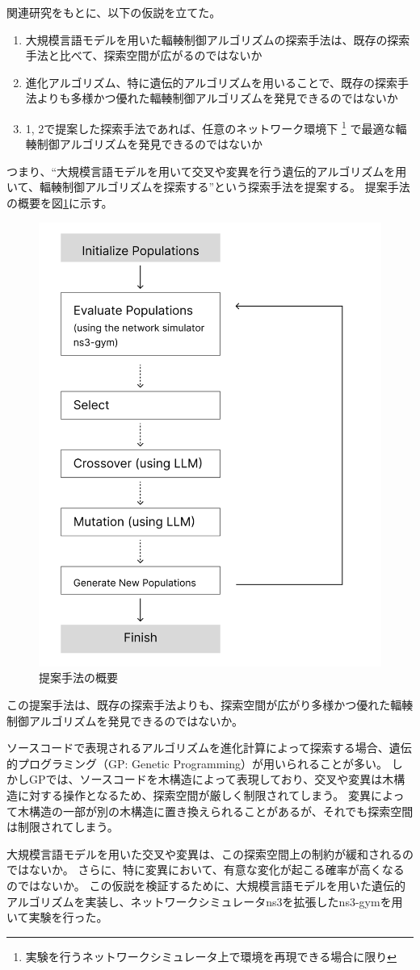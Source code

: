 \documentclass[a4paper,11pt]{jreport}
\newcommand{\figref}[1]{図\ref{#1}}
\begin{document}
関連研究をもとに、以下の仮説を立てた。
\begin{enumerate}
  \item 大規模言語モデルを用いた輻輳制御アルゴリズムの探索手法は、既存の探索手法と比べて、探索空間が広がるのではないか
  \item 進化アルゴリズム、特に遺伝的アルゴリズムを用いることで、既存の探索手法よりも多様かつ優れた輻輳制御アルゴリズムを発見できるのではないか
  \item 1, 2で提案した探索手法であれば、任意のネットワーク環境下
  \footnote{実験を行うネットワークシミュレータ上で環境を再現できる場合に限り}
  で最適な輻輳制御アルゴリズムを発見できるのではないか
\end{enumerate}
つまり、``大規模言語モデルを用いて交叉や変異を行う遺伝的アルゴリズムを用いて、輻輳制御アルゴリズムを探索する''という探索手法を提案する。
提案手法の概要を\figref{figure:proposed_flow}に示す。
\begin{figure}[htbp]
  \centering
  \includegraphics[width=0.4\linewidth]{fig/chap03/proposed_flow.png}
  \caption{提案手法の概要}
  \label{figure:proposed_flow}
\end{figure}
この提案手法は、既存の探索手法よりも、探索空間が広がり多様かつ優れた輻輳制御アルゴリズムを発見できるのではないか。

ソースコードで表現されるアルゴリズムを進化計算によって探索する場合、遺伝的プログラミング（GP: Genetic Programming）が用いられることが多い。
しかしGPでは、ソースコードを木構造によって表現しており、交叉や変異は木構造に対する操作となるため、探索空間が厳しく制限されてしまう。
変異によって木構造の一部が別の木構造に置き換えられることがあるが、それでも探索空間は制限されてしまう。

大規模言語モデルを用いた交叉や変異は、この探索空間上の制約が緩和されるのではないか。
さらに、特に変異において、有意な変化が起こる確率が高くなるのではないか。
この仮説を検証するために、大規模言語モデルを用いた遺伝的アルゴリズムを実装し、ネットワークシミュレータns3\cite{ns3-2012, ns3-2010}を拡張したns3-gym\cite{ns3gym}を用いて実験を行った。
\end{document}
